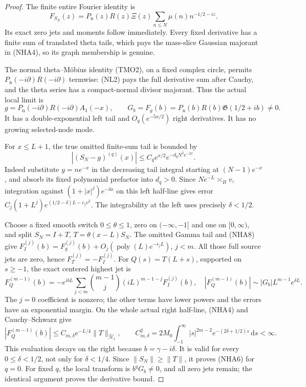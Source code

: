 \documentclass[11pt]{article}
\theoremstyle{remark}\newtheorem{remark}[theorem]{Remark}
\newcommand{\dd}{\,\mathrm d}
\begin{document}
\begin{proof}
The finite entire Fourier identity is
\[
 F_{S_N}(z)=P_{\mathrm n}(z)R(z)\Xi(z)
                  \sum_{n\le N}\mu(n)n^{-1/2-iz}.
\]
Its exact zero jets and moments follow immediately.
Every fixed derivative has a finite sum of translated
theta tails, which pays the mass-slice Gaussian majorant
in (NHA4), so its graph membership is genuine.

The normal theta--M\"obius identity (TMO2), on a fixed
complex circle, permits \(P_{\mathrm n}(-i\partial)R(-i\partial)\)
termwise: (NL2) pays the full derivative sum after Cauchy,
and the theta series has a compact-normal divisor majorant.
Thus the actual local limit is
\[
 g=P_{\mathrm n}(-i\partial)R(-i\partial)A_1(-x),\qquad
 G_b=F_g(b)=P_{\mathrm n}(b)R(b)\mathfrak G(1/2+ib)\ne0.
                                                               \tag{NHA7}
\]
It has a double-exponential left tail and \(O_q(e^{-5x/2})\)
right derivatives. It has no growing selected-node mode.

For \(x\le L+1\), the true omitted finite-sum tail is bounded by
\[
 |(S_N-g)^{(q)}(x)|
        \le C_qe^{x/2}e^{-d_qN^2e^{-2x}}.                    \tag{NHA8}
\]
Indeed substitute \(y=ne^{-x}\) in the decreasing tail
integral starting at \((N-1)e^{-x}\), and absorb its fixed
polynomial prefactor into \(d_q>0\).
Since \(Ne^{-L}\asymp_Bv\), integration against
\((1+|x|^j)e^{-\delta x}\) on this left half-line gives error
\(C_j(1+L^j)e^{(1/2-\delta)L-c_jv^2}\).
The integrability at the left uses precisely \(\delta<1/2\).

Choose a fixed smooth switch \(0\le\theta\le1\), zero on
\((-\infty,-1]\) and one on \([0,\infty)\), and split
\(S_N=I+T\), \(T=\theta(x-L)S_N\).
The omitted Gamma tail and (NHA8) give
\(F_I^{(j)}(b)=F_g^{(j)}(b)+O_j(\operatorname{poly}(L)
e^{-\epsilon_jL})\), \(j<m\).
All those full source jets are zero, hence \(F_T^{(j)}=-F_I^{(j)}\).
For \(Q(s)=T(L+s)\), supported on \(s\ge-1\), the exact
centered highest jet is
\[
 F_Q^{(m-1)}(b)
  =-e^{ibL}\sum_{j<m}\binom{m-1}{j}(iL)^{m-1-j}F_I^{(j)}(b),
 \quad
 |F_Q^{(m-1)}(b)|\sim|G_b|L^{m-1}e^{\delta L}.                 \tag{NHA9}
\]
The \(j=0\) coefficient is nonzero; the other terms have
lower powers and the errors have an exponential margin.
On the whole actual right half-line, (NHA4) and Cauchy--Schwarz give
\[
 |F_Q^{(m-1)}(b)|
 \le C_{m,\delta}e^{-L/4}\|T\|_{\widehat{\mathcal H}_t},\qquad
 C_{m,\delta}^2
  =2M_0\int_{-1}^\infty
               |s|^{2m-2}e^{-(2\delta+1/2)s}\dd s<\infty .
\]
This evaluation decays on the right because \(b=\gamma-i\delta\).
It is valid for every \(0\le\delta<1/2\), not only for
\(\delta<1/4\). Since \(\|S_N\|\ge\|T\|\), it proves
(NHA6) for \(q=0\). For fixed \(q\), the local transform
is \(b^qG_b\ne0\), and all zero jets remain; the identical
argument proves the derivative bound.
\end{proof}
\end{document}
